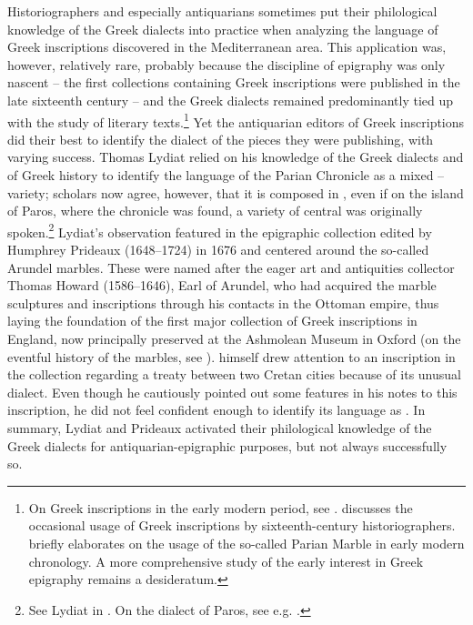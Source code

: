 Historiographers and especially antiquarians sometimes put their philological knowledge of the Greek dialects into practice when analyzing the language of Greek inscriptions discovered in the Mediterranean area. This application was, however, relatively rare, probably because the discipline of epigraphy was only nascent – the first collections containing Greek inscriptions were published in the late sixteenth century – and the Greek dialects remained predominantly tied up with the study of literary texts.\footnote{On Greek inscriptions in the early modern period, see \citet{Stenhouse_greekness_nodate}. \citet{Stenhouse2005} discusses the occasional usage of Greek inscriptions by sixteenth-century  historiographers. \citet{Liddel2014} briefly elaborates on the usage of the so-called Parian Marble in early modern chronology. A more comprehensive study of the early interest in Greek epigraphy remains a desideratum.} Yet the antiquarian editors of Greek inscriptions did their best to identify the dialect of the pieces they were publishing, with varying success. Thomas Lydiat relied on his knowledge of the Greek dialects and of Greek history to identify the language of the Parian Chronicle as a mixed – variety; scholars now agree, however, that it is composed in , even if on the island of Paros, where the chronicle was found, a variety of central  was originally spoken.\footnote{See Lydiat in \citet[\textsc{ii}.116–117]{Prideaux1676}. On the dialect of Paros, see e.g. \citet[531]{Alonso2018}.} Lydiat’s observation featured in the epigraphic collection edited by Humphrey Prideaux (1648–1724) in 1676 and centered around the so-called Arundel marbles. These were named after the eager art and antiquities collector Thomas Howard (1586–1646), Earl of Arundel, who had acquired the marble sculptures and inscriptions through his contacts in the Ottoman empire, thus laying the foundation of the first major collection of Greek inscriptions in England, now principally preserved at the Ashmolean Museum in Oxford (on the eventful history of the marbles, see \citealt{Vickers2006}). \citet[\textsc{i.}a.1\textsc{\textsuperscript{v}}, 123]{Prideaux1676} himself drew attention to an inscription in the collection regarding a treaty between two Cretan cities because of its unusual dialect. Even though he cautiously pointed out some  features in his notes to this inscription, he did not feel confident enough to identify its language as . In summary, Lydiat and Prideaux activated their philological knowledge of the Greek dialects for antiquarian-epigraphic purposes, but not always successfully so.

